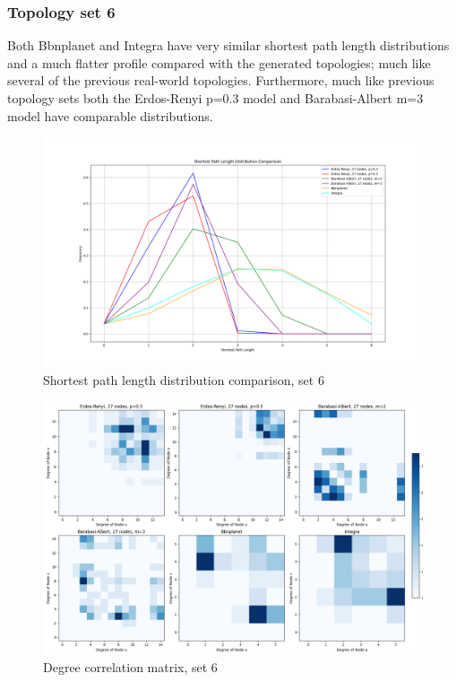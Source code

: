\subsubsection{Topology set 6}
Both Bbnplanet and Integra have very similar shortest path length distributions and a much flatter profile compared with the generated topologies; much like several of the previous real-world topologies. Furthermore, much like previous topology sets both the Erdos-Renyi p=0.3 model and Barabasi-Albert m=3 model have comparable distributions. 
\begin{figure}
    \centering
    \includegraphics[width=0.9\linewidth]{images/FINAL-TOPO-COMP/line-27.png}
    \caption{Shortest path length distribution comparison, set 6}
    \label{fig:enter-label}
\end{figure}

\begin{figure}
    \centering
    \includegraphics[width=0.9\linewidth]{images/FINAL-TOPO-COMP/Degree-correlation-matrices/27-matrix.png}
    \caption{Degree correlation matrix, set 6}
    \label{fig:enter-label}
\end{figure}

